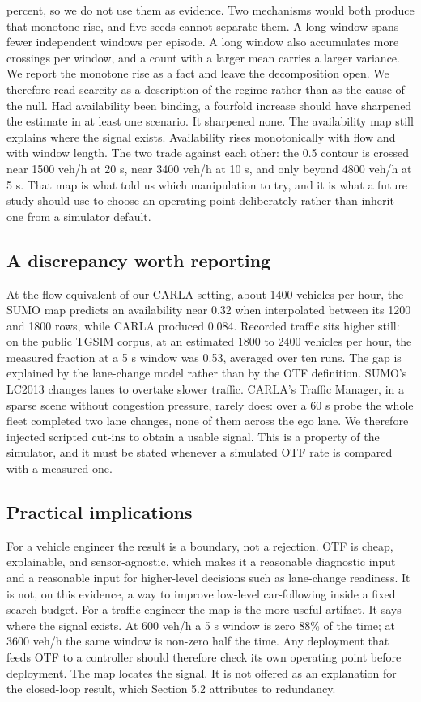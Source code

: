 \documentclass[journal]{IEEEtran}
\begin{document}
percent, so we do not use them as evidence.
Two mechanisms would both produce that monotone rise, and five seeds cannot separate them. A long window
spans fewer independent windows per episode. A long window also accumulates more crossings per window,
and a count with a larger mean carries a larger variance. We report the monotone rise as a fact and
leave the decomposition open.
We therefore read scarcity as a description of the regime rather than as the cause of the null. Had
availability been binding, a fourfold increase should have sharpened the estimate in at least one
scenario. It sharpened none.
The availability map still explains where the signal exists. Availability rises monotonically with flow
and with window length. The two trade against each other: the 0.5 contour is crossed near 1500 veh/h at
20 s, near 3400 veh/h at 10 s, and only beyond 4800 veh/h at 5 s. That map is what told us which
manipulation to try, and it is what a future study should use to choose an operating point deliberately
rather than inherit one from a simulator default.
\subsection{A discrepancy worth reporting}
At the flow equivalent of our CARLA setting, about 1400 vehicles per hour, the SUMO map predicts an
availability near 0.32 when interpolated between its 1200 and 1800 rows, while CARLA produced 0.084. Recorded traffic sits higher still: on the public TGSIM corpus, at an estimated
1800 to 2400 vehicles per hour, the measured fraction at a 5 s window was 0.53, averaged over ten runs. The gap is explained by
the lane-change model rather than by the OTF definition.
SUMO's LC2013 changes lanes to overtake slower traffic. CARLA's Traffic Manager, in a sparse scene
without congestion pressure, rarely does: over a 60 s probe the whole fleet completed two lane
changes, none of them across the ego lane. We therefore injected scripted cut-ins to obtain a usable
signal. This is a property of the simulator, and it must be stated whenever a simulated OTF rate is
compared with a measured one.
\subsection{Practical implications}
For a vehicle engineer the result is a boundary, not a rejection. OTF is cheap, explainable, and
sensor-agnostic, which makes it a reasonable diagnostic input and a reasonable input for
higher-level decisions such as lane-change readiness. It is not, on this evidence, a way to improve
low-level car-following inside a fixed search budget.
For a traffic engineer the map is the more useful artifact. It says where the signal exists. At
600 veh/h a 5 s window is zero 88\% of the time; at 3600 veh/h the same window is non-zero half the
time. Any deployment that feeds OTF to a controller should therefore check its own operating point
before deployment. The map locates the signal. It is not offered as an explanation for the closed-loop
result, which Section 5.2 attributes to redundancy.
\end{document}
